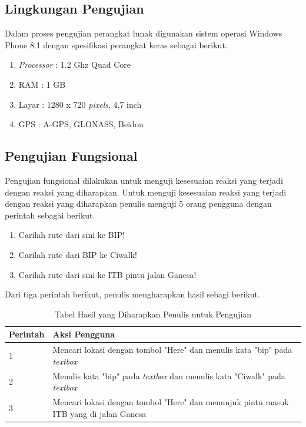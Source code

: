 \subsection{Lingkungan Pengujian}
\label{lab:Lingkungan Pengujian}
\hspace{0.5cm} Dalam proses pengujian perangkat lunak digunakan sistem operasi Windows Phone 8.1 dengan spesifikasi perangkat keras sebagai berikut.
\begin{enumerate}
	\item \textit{Processor} : 1.2 Ghz Quad Core
	\item RAM : 1 GB
	\item Layar : 1280 x 720 \textit{pixels}, 4,7 inch
	\item GPS : A-GPS, GLONASS, Beidou
\end{enumerate}

\subsection{Pengujian Fungsional}
\label{lab:Pengujian Fungsional}
\hspace{0.5cm} Pengujian fungsional dilakukan untuk menguji kesesuaian reaksi yang terjadi dengan reaksi yang diharapkan. Untuk menguji kesesuaian reaksi yang terjadi dengan reaksi yang diharapkan penulis menguji 5 orang pengguna dengan perintah sebagai berikut. 
\begin{enumerate}
	\item Carilah rute dari sini ke BIP!
	\item Carilah rute dari BIP ke Ciwalk!
	\item Carilah rute dari sini ke ITB pintu jalan Ganesa!
\end{enumerate}

Dari tiga perintah berikut, penulis mengharapkan hasil sebagi berikut.
\begin{table}[h]
	\centering
		\begin{tabular}{|p{2cm}|p{10cm}|}\hline
				Perintah & Aksi Pengguna \\ \hline
				1 & Mencari lokasi dengan tombol "Here" dan menulis kata "bip" pada \textit{textbox} \\ \hline
				2 & Menulis kata "bip" pada \textit{textbox} dan menulis kata "Ciwalk" pada \textit{textbox} \\ \hline
				3 & Mencari lokasi dengan tombol "Here" dan menunjuk pintu masuk ITB yang di jalan Ganesa \\ \hline
		\end{tabular}
	\caption{Tabel Hasil yang Diharapkan Penulis untuk Pengujian}
	\label{tab:TabelHasilyangdiharapkanPenulis}
\end{table}

